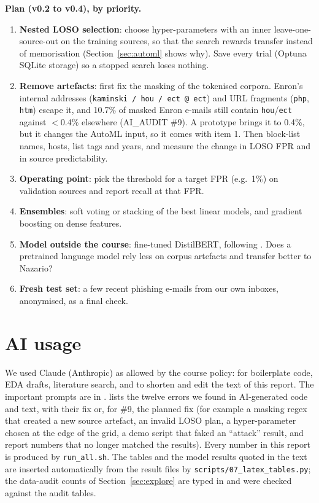\documentclass[11pt,a4paper]{article}
\begin{document}
\textbf{Plan (v0.2 to v0.4), by priority.}
\begin{enumerate}
\item \textbf{Nested LOSO selection}: choose hyper-parameters with an inner leave-one-source-out on the training sources, so that the search rewards transfer instead of memorisation (Section~\ref{sec:automl} shows why). Save every trial (Optuna SQLite storage) so a stopped search loses nothing.
\item \textbf{Remove artefacts}: first fix the masking of the tokenised corpora. Enron's internal addresses (\texttt{kaminski / hou / ect @ ect}) and URL fragments (\texttt{php}, \texttt{htm}) escape it, and 10.7\% of masked Enron e-mails still contain \texttt{hou}/\texttt{ect} against $<$0.4\% elsewhere (AI\_AUDIT \#9). A prototype brings it to 0.4\%, but it changes the AutoML input, so it comes with item 1. Then block-list names, hosts, list tags and years, and measure the change in LOSO FPR and in source predictability.
\item \textbf{Operating point}: pick the threshold for a target FPR (e.g.\ 1\%) on validation sources and report recall at that FPR.
\item \textbf{Ensembles}: soft voting or stacking of the best linear models, and gradient boosting on dense features.
\item \textbf{Model outside the course}: fine-tuned DistilBERT, following \cite{ahmed2026}. Does a pretrained language model rely less on corpus artefacts and transfer better to Nazario?
\item \textbf{Fresh test set}: a few recent phishing e-mails from our own inboxes, anonymised, as a final check.
\end{enumerate}

\section*{AI usage}
We used Claude (Anthropic) as allowed by the course policy: for boilerplate code, EDA drafts, literature search, and to shorten and edit the text of this report. The important prompts are in .  lists the twelve errors we found in AI-generated code and text, with their fix or, for \#9, the planned fix (for example a masking regex that created a new source artefact, an invalid LOSO plan, a hyper-parameter chosen at the edge of the grid, a demo script that faked an ``attack'' result, and report numbers that no longer matched the results). Every number in this report is produced by \texttt{run\_all.sh}. The tables and the model results quoted in the text are inserted automatically from the result files by \texttt{scripts/07\_latex\_tables.py}; the data-audit counts of Section~\ref{sec:explore} are typed in and were checked against the audit tables.
\end{document}
